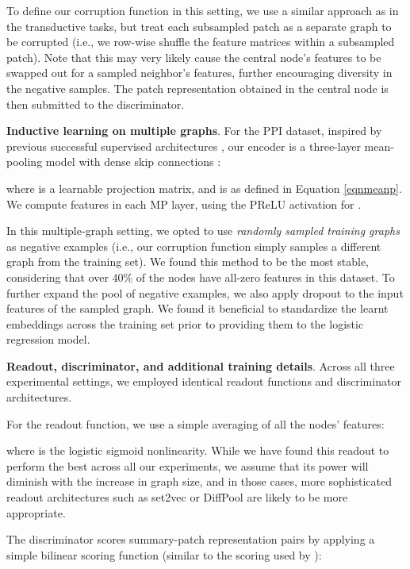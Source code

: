 \documentclass{article} \usepackage{iclr2019_conference,times}
\newcommand{\xhdr}[1]{{\noindent\bfseries #1}.}
\begin{document}
To define our corruption function in this setting, we use a similar approach as in the transductive tasks, but treat each subsampled patch as a separate graph to be corrupted (i.e., we row-wise shuffle the feature matrices within a subsampled patch). Note that this may very likely cause the central node's features to be swapped out for a sampled neighbor's features, further encouraging diversity in the negative samples. The patch representation obtained in the central node is then submitted to the discriminator.

\xhdr{Inductive learning on multiple graphs} 
For the PPI dataset, inspired by previous successful supervised architectures \citep{velickovic2018graph}, our encoder is a three-layer mean-pooling model with dense skip connections \citep{he2016deep,huang2017densely}:
 
where  is a learnable projection matrix, and  is as defined in Equation \ref{eqnmeanp}. We compute  features in each MP layer, using the PReLU activation for .

In this multiple-graph setting, we opted to use \emph{randomly sampled training graphs} as negative examples (i.e., our corruption function simply samples a different graph from the training set). We found this method to be the most stable, considering that over 40\% of the nodes have all-zero features in this dataset. To further expand the pool of negative examples, we also apply dropout \citep{srivastava2014dropout} to the input features of the sampled graph. We found it beneficial to standardize the learnt embeddings across the training set prior to providing them to the logistic regression model.

\xhdr{Readout, discriminator, and additional training details}
Across all three experimental settings, we employed identical readout functions and discriminator architectures. 

For the readout function, we use a simple averaging of all the nodes' features:

where  is the logistic sigmoid nonlinearity. While we have found this readout to perform the best across all our experiments, we assume that its power will diminish with the increase in graph size, and in those cases, more sophisticated readout architectures such as set2vec \citep{vinyals2015order} or DiffPool \citep{ying2018hierarchical} are likely to be more appropriate.

The discriminator scores summary-patch representation pairs by applying a simple bilinear scoring function (similar to the scoring used by \cite{oord2018representation}):
\end{document}
